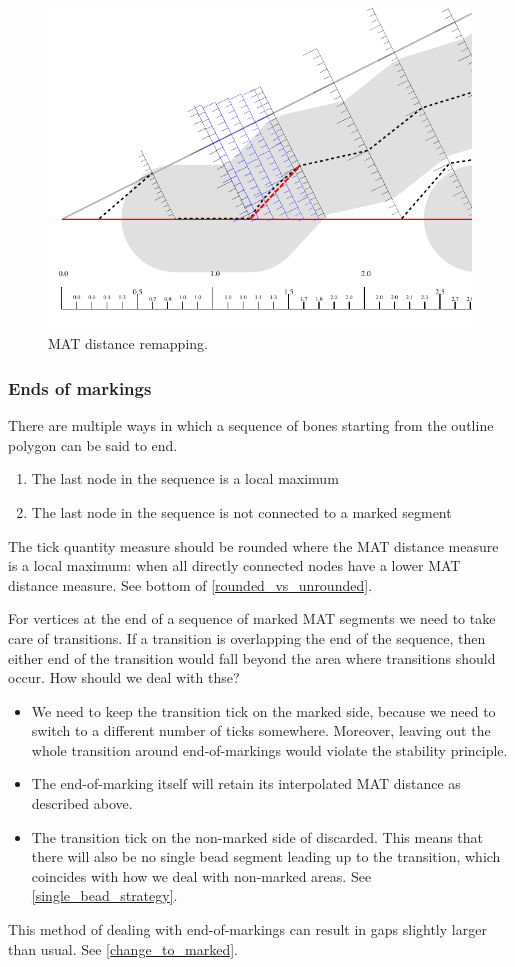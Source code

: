 \begin{figure}[H]
\centering
\includegraphics[width=.9\columnwidth]{sources/method/distance_rounding_transition.pdf}
\caption{MAT distance remapping.}
\label{distance_rounding_transition}
\end{figure}


\subsubsection{Ends of markings}
There are multiple ways in which a sequence of bones starting from the outline polygon can be said to end.
\begin{enumerate}
\item The last node in the sequence is a local maximum
\item The last node in the sequence is not connected to a marked segment
\end{enumerate}

The tick quantity measure should be rounded
where the MAT distance measure is a local maximum: when all directly connected nodes have a lower MAT distance measure.
See bottom of \cref{rounded_vs_unrounded}.



For vertices at the end of a sequence of marked MAT segments we need to take care of transitions.
If a transition is overlapping the end of the sequence, then either end of the transition would fall beyond the area where transitions should occur.
How should we deal with thse?
\begin{itemize}
\item We need to keep the transition tick on the marked side, because we need to switch to a different number of ticks somewhere.
Moreover, leaving out the whole transition around end-of-markings would violate the stability principle.
\item The end-of-marking itself will retain its interpolated MAT distance as described above.
\item The transition tick on the non-marked side of discarded.
This means that there will also be no single bead segment leading up to the transition, which coincides with how we deal with non-marked areas.
See \cref{single_bead_strategy}.
\end{itemize}
This method of dealing with end-of-markings can result in gaps slightly larger than usual.
See \cref{change_to_marked}.

